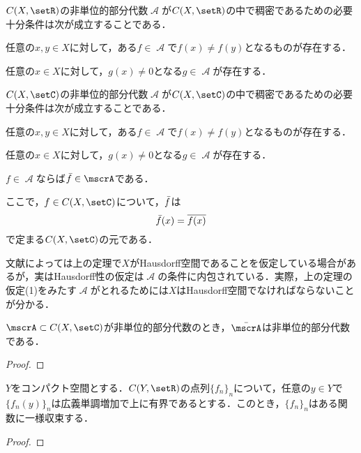 \documentclass[uplatex]{jsarticle}
\begin{document}
\begin{theorem}\label{SWR}
    $C(X,\setR)$の非単位的部分代数$\mscrA$が$C(X,\setR)$の中で稠密であるための必要十分条件は次が成立することである．
    \begin{enumarabicp}
        \item 任意の$x,y\in X$に対して，ある$f\in \mscrA$で$f(x)\neq f(y)$となるものが存在する．
        \item 任意の$x\in X$に対して，$g(x)\neq 0$となる$g\in \mscrA$が存在する．
    \end{enumarabicp}
\end{theorem}

\begin{theorem}\label{SWC}
    $C(X,\setC)$の非単位的部分代数$\mscrA$が$C(X,\setC)$の中で稠密であるための必要十分条件は次が成立することである．
    \begin{enumarabicp}
        \item 任意の$x,y\in X$に対して，ある$f\in \mscrA$で$f(x)\neq f(y)$となるものが存在する．
        \item 任意の$x\in X$に対して，$g(x)\neq 0$となる$g\in \mscrA$が存在する．
        \item $f\in \mscrA$ならば$\Bar{f}\in \mscrA$である．
    \end{enumarabicp}
    ここで，$f\in C(X,\setC)$について，$\Bar{f}$は
    \[ \Bar{f}(x) = \overline{f(x)} \]
    で定まる$C(X,\setC)$の元である．
\end{theorem}

\begin{remark}
    文献によっては上の定理で$X$がHausdorff空間であることを仮定している場合があるが，実はHausdorff性の仮定は$\mscrA$の条件に内包されている．実際，上の定理の仮定(1)をみたす$\mscrA$がとれるためには$X$はHausdorff空間でなければならないことが分かる．
\end{remark}

\begin{lemma}
    $\mscrA\subset C(X,\setC)$が非単位的部分代数のとき，$\Bar{\mscrA}$は非単位的部分代数である．
\end{lemma}
\begin{proof}

\end{proof}

\begin{proposition}[Diniの定理]
    $Y$をコンパクト空間とする．$C(Y,\setR)$の点列$\{f_n\}_n$について，任意の$y\in Y$で$\{f_n(y)\}_n$は広義単調増加で上に有界であるとする．このとき，$\{f_n\}_n$はある関数に一様収束する．
\end{proposition}
\begin{proof}

\end{proof}
\end{document}
